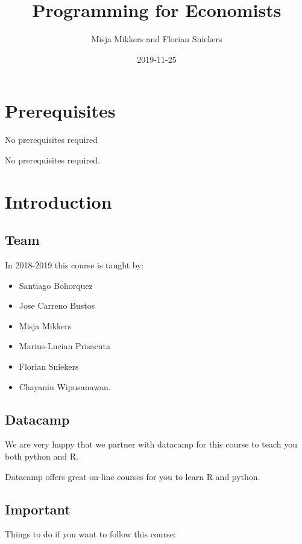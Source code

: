 \documentclass[]{book}
\title{Programming for Economists}
\author{Misja Mikkers and Florian Sniekers}
\date{2019-11-25}
\providecommand{\tightlist}{%
  \setlength{\itemsep}{0pt}\setlength{\parskip}{0pt}}
\begin{document}
\maketitle

{
\setcounter{tocdepth}{1}
\tableofcontents
}
\chapter{Prerequisites}\label{prerequisites}

No prerequisites required

No prerequisites required.

\chapter{Introduction}\label{intro}

\section{Team}\label{team}

In 2018-2019 this course is taught by:

\begin{itemize}
\tightlist
\item
  Santiago Bohorquez
\item
  Jose Carreno Bustos
\item
  Misja Mikkers
\item
  Marius-Lucian Prisacuta
\item
  Florian Sniekers
\item
  Chayanin Wipusanawan.
\end{itemize}

\section{Datacamp}\label{datacamp}

We are very happy that we partner with datacamp for this course to teach
you both python and R.

Datacamp offers great on-line courses for you to learn R and python.

\section{Important}\label{important}

Things to do if you want to follow this course:
\end{document}
